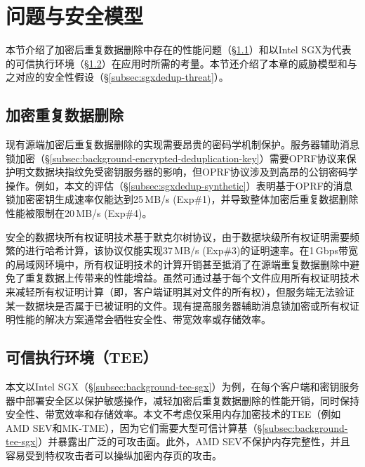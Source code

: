 \section{问题与安全模型}
\label{sec:sgxdedup-background}

本节介绍了加密后重复数据删除中存在的性能问题（\S\ref{subsec:sgxdedup-problem}）和以Intel SGX为代表的可信执行环境（\S\ref{subsec:sgxdedup-sgx}）在应用时所需的考量。本节还介绍了本章的威胁模型和与之对应的安全性假设（\S\ref{subsec:sgxdedup-threat}）。

\subsection{加密重复数据删除}
\label{subsec:sgxdedup-problem}

现有源端加密后重复数据删除的实现需要昂贵的密码学机制保护。服务器辅助消息锁加密（\S\ref{subsec:background-encrypted-deduplication-key}）需要OPRF协议\cite{naor2004Number}来保护明文数据块指纹免受密钥服务器的影响，但OPRF协议涉及到高昂的公钥密码学操作。例如，本文的评估（\S\ref{subsec:sgxdedup-synthetic}）表明基于OPRF的消息锁加密密钥生成速率仅能达到25\,MB/s (Exp\#1)，并导致整体加密后重复数据删除性能被限制在20\,MB/s (Exp\#4)。

安全的数据块所有权证明技术基于默克尔树协议，由于数据块级所有权证明需要频繁的进行哈希计算，该协议仅能实现37\,MB/s (Exp\#3)的证明速率。在1\,Gbps带宽的局域网环境中，所有权证明技术的计算开销甚至抵消了在源端重复数据删除中避免了重复数据上传带来的性能增益。虽然可通过基于每个文件应用所有权证明技术来减轻所有权证明计算（即，客户端证明其对文件的所有权），但服务端无法验证某一数据块是否属于已被证明的文件。现有提高服务器辅助消息锁加密或所有权证明性能的解决方案通常会牺牲安全性\cite{li2020TED,xu2013weak,pietro12}、带宽效率\cite{harnik2010side,li15}或存储效率\cite{zhou2015secdep,qin17,li2020TED}。


\subsection{可信执行环境（TEE）}
\label{subsec:sgxdedup-sgx} 

本文以Intel SGX\cite{sgx}（\S\ref{subsec:background-tee-sgx}）为例，在每个客户端和密钥服务器中部署安全区以保护敏感操作，减轻加密后重复数据删除的性能开销，同时保持安全性、带宽效率和存储效率。本文不考虑仅采用内存加密技术的TEE（例如AMD SEV\cite{AMDSEV}和MK-TME\cite{MK-TME}），因为它们需要大型可信计算基（\S\ref{subsec:background-tee-sgx}）并暴露出广泛的可攻击面\cite{mofrad18}。此外，AMD SEV\cite{AMDSEV}不保护内存完整性，并且容易受到特权攻击者可以操纵加密内存页\cite{mofrad18}的攻击。


